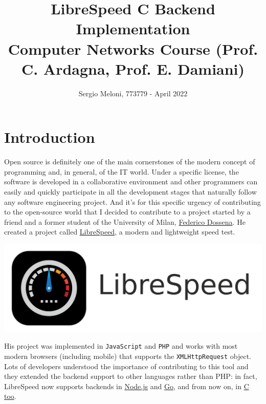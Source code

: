 \documentclass{article}
\title{%
  LibreSpeed C Backend Implementation \\
  \large Computer Networks Course (Prof. C. Ardagna, Prof. E. Damiani)}
\author{Sergio Meloni, 773779 - April 2022}
\date{\vspace{-5ex}}
\begin{document}
\maketitle

{
 \hypersetup{linkcolor=black}
 \tableofcontents
}

\newpage
\section{Introduction}
Open source is definitely one of the main cornerstones of the modern concept of programming and, in general, of the IT world. Under a specific license, the software is developed in a collaborative environment and other programmers can easily and quickly participate in all the development stages that naturally follow any software engineering project.
And it’s for this specific urgency of contributing to the open-source world that I decided to contribute to a project started by a friend and a former student of the University of Milan, \href{https://www.fdossena.com}{Federico Dossena}. He created a project called \href{https://www.librespeed.org}{LibreSpeed}, a modern and lightweight speed test.

\begin{center}
\begin{minipage}{8cm}
\includegraphics[width=\textwidth]{logo3}
\end{minipage}
\end{center}

His project was implemented in \texttt{JavaScript} and \texttt{PHP} and works with most modern browsers (including mobile) that supports the \texttt{XMLHttpRequest} object.
Lots of developers understood the importance of contributing to this tool and they extended the backend support to other languages rather than PHP: in fact, LibreSpeed now supports backends in \href{https://github.com/librespeed/speedtest/tree/node}{Node.js} and \href{https://github.com/librespeed/speedtest-go}{Go}, and from now on, in \href{https://github.com/sergiusxp/LibreSpeedCBackend}{C too}.
\end{document}
